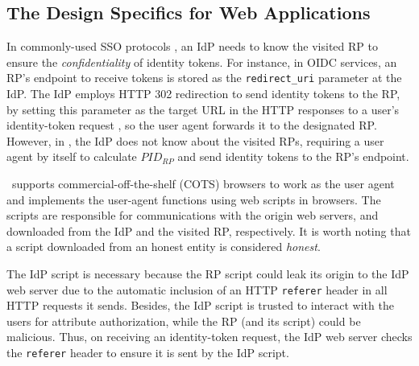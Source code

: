 \subsection{The Design Specifics for Web Applications}
\label{sec:web-design}

In commonly-used SSO protocols \cite{OpenIDConnect,rfc6749, SAML, SAMLIdentifier},
an IdP needs to know the visited RP to ensure the \emph{confidentiality} of identity tokens. For instance, in OIDC services, an RP's endpoint to receive tokens is stored as the \verb+redirect_uri+ parameter at the IdP.
The IdP employs HTTP 302 redirection to send identity tokens to the RP, by setting this parameter as the target URL in the HTTP responses to a user's identity-token request \cite{OpenIDConnect}, so the user agent forwards it to the designated RP.
However, in \usso, the IdP does not know about the visited RPs, requiring a user agent by itself to calculate $PID_{RP}$ and send identity tokens to the RP's endpoint.

\usso\ supports commercial-off-the-shelf (COTS) browsers to work as the user agent and implements the user-agent functions using web scripts in browsers. The scripts are responsible for communications with the origin web servers,
 and downloaded from the IdP and the visited RP, respectively. It is worth noting that a script downloaded from an honest entity is considered \emph{honest}.

The IdP script is necessary because the RP script could leak its origin to the IdP web server due to the automatic inclusion of an HTTP \verb+referer+ header in all HTTP requests it sends.
Besides, the IdP script is trusted to interact with the users for attribute authorization,
  while the RP (and its script) could be malicious.
Thus, on receiving an identity-token request, the IdP web server checks the \verb+referer+ header to ensure it is sent by the IdP script.

